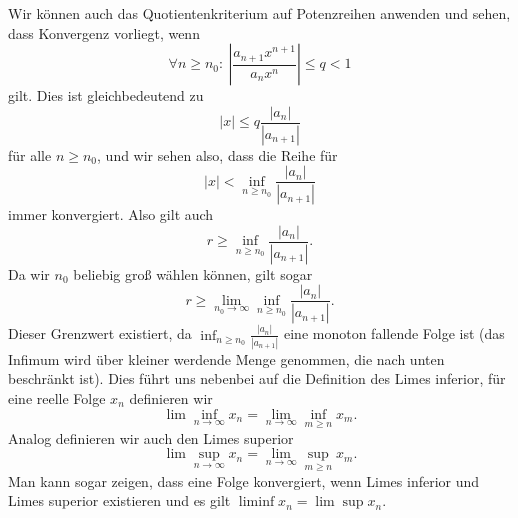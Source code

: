 Wir können auch das Quotientenkriterium auf Potenzreihen anwenden und sehen, dass Konvergenz vorliegt, wenn
\begin{equation*}
 \forall n \geq n_0: ~\left\vert \frac{a_{n+1} x^{n+1}}{a_n x^n} \right\vert \leq q < 1
\end{equation*}
gilt. Dies ist gleichbedeutend zu
\begin{equation*}
 |x| \leq q \frac{|a_n|}{|a_{n+1}|}
\end{equation*}
für alle \(n \geq n_0\), und wir sehen also, dass die Reihe für
\begin{equation*}
 |x|<\inf_{n \geq n_0} \frac{|a_n|}{|a_{n+1}|}
\end{equation*}
immer konvergiert. Also gilt auch
\begin{equation*}
 r \geq \inf_{n \geq n_0} \frac{|a_n|}{|a_{n+1}|} .
\end{equation*}
Da wir \(n_0\) beliebig groß wählen können, gilt sogar
\begin{equation*}
 r \geq \lim_{n_0 \rightarrow \infty} \inf_{n \geq n_0} \frac{|a_n|}{|a_{n+1}|} .
\end{equation*}
Dieser Grenzwert existiert, da \( \inf_{n \geq n_0} \frac{|a_n|}{|a_{n+1}|}\) eine monoton fallende Folge ist (das Infimum wird über kleiner werdende Menge genommen, die nach unten beschränkt ist).
Dies führt uns nebenbei  auf die Definition des Limes inferior, für eine reelle Folge \(x_n\) definieren wir
\begin{equation*}
 \lim\inf_{n \rightarrow \infty} x_n = \lim_{n \rightarrow \infty} \inf_{m \geq n} x_m .
\end{equation*}
Analog definieren wir auch den Limes superior
\begin{equation*}
 \lim\sup_{n \rightarrow \infty} x_n = \lim_{n \rightarrow \infty} \sup_{m \geq n} x_m .
\end{equation*}
Man kann sogar zeigen, dass eine Folge konvergiert, wenn Limes inferior und Limes superior existieren und es gilt \(\liminf x_n = \lim\sup x_n\).


